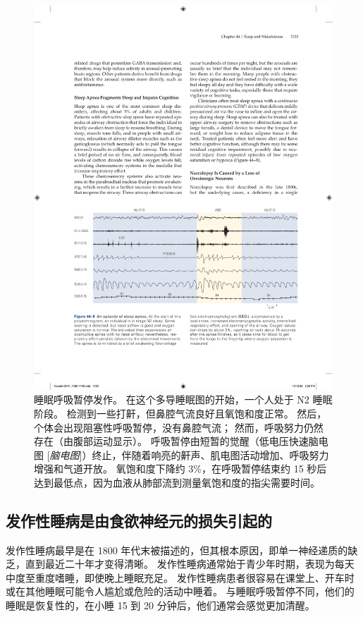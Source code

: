 \begin{figure}[htbp]
	\centering
	\includegraphics[width=0.85\linewidth]{chap44/fig_44_8}
	\caption{睡眠呼吸暂停发作。
		在这个多导睡眠图的开始，一个人处于 N2 睡眠阶段。
		检测到一些打鼾，但鼻腔气流良好且氧饱和度正常。
		然后，个体会出现阻塞性呼吸暂停，没有鼻腔气流；
		然而，呼吸努力仍然存在（由腹部运动显示）。
		呼吸暂停由短暂的觉醒（低电压快速脑电图 [\textit{脑电图}]）终止，伴随着响亮的鼾声、肌电图活动增加、呼吸努力增强和气道开放。
		氧饱和度下降约 3\%，在呼吸暂停结束约 15 秒后达到最低点，因为血液从肺部流到测量氧饱和度的指尖需要时间。}
	\label{fig:44_8}
\end{figure}


\subsection{发作性睡病是由食欲神经元的损失引起的}

发作性睡病最早是在 1800 年代末被描述的，但其根本原因，即单一神经递质的缺乏，直到最近二十年才变得清晰。
发作性睡病通常始于青少年时期，表现为每天中度至重度嗜睡，即使晚上睡眠充足。
发作性睡病患者很容易在课堂上、开车时或在其他睡眠可能令人尴尬或危险的活动中睡着。
与睡眠呼吸暂停不同，他们的睡眠是恢复性的，在小睡 15 到 20 分钟后，他们通常会感觉更加清醒。


